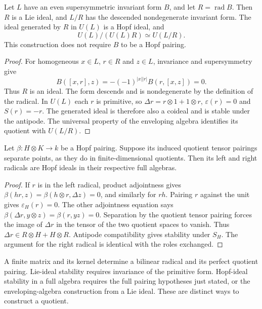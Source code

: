 \begin{proposition}
\label{lem:hopf-radical-ideal-coideal}
Let $L$ have an even supersymmetric invariant form $B$, and let
$R=\operatorname{rad}B$. Then $R$ is a Lie ideal, and $L/R$
has the descended nondegenerate invariant form. The ideal
generated by $R$ in $U(L)$ is a Hopf ideal, and
\[
 U(L)/(U(L)R)\simeq U(L/R).
\]
This construction does not require $B$ to be a Hopf pairing.
\end{proposition}

\begin{proof}
For homogeneous $x\in L$, $r\in R$ and $z\in L$, invariance
and supersymmetry give
\[
 B([x,r],z)=-(-1)^{|x||r|}B(r,[x,z])=0.
\]
Thus $R$ is an ideal. The form descends and is nondegenerate
by the definition of the radical. In $U(L)$ each $r$ is
primitive, so $\Delta r=r\otimes1+1\otimes r$,
$\varepsilon(r)=0$ and $S(r)=-r$. The generated ideal is
therefore also a coideal and is stable under the antipode.
The universal property of the enveloping algebra identifies
its quotient with $U(L/R)$.
\end{proof}

\begin{proposition}
\label{hall:prop:full-hopf-radical}
Let $\beta:H\otimes K\to k$ be a Hopf pairing. Suppose its
induced quotient tensor pairings separate points, as they do
in finite-dimensional quotients. Then its left and right
radicals are Hopf ideals in their respective full algebras.
\end{proposition}

\begin{proof}
If $r$ is in the left radical, product adjointness gives
$\beta(hr,z)=\beta(h\otimes r,\Delta z)=0$, and similarly
for $rh$. Pairing $r$ against the unit gives
$\varepsilon_H(r)=0$. The other adjointness equation says
$\beta(\Delta r,y\otimes z)=\beta(r,yz)=0$.
Separation by the quotient tensor pairing forces the image
of $\Delta r$ in the tensor of the two quotient spaces to
vanish. Thus $\Delta r\in R\otimes H+H\otimes R$.
Antipode compatibility gives stability under $S_H$.
The argument for the right radical is identical with the
roles exchanged.
\end{proof}

\begin{proposition}
\label{prop:pairing-matrix-not-hopf-pairing-proof}
\label{prop:geometric-hopf-pairing-data-give-defects}
A finite matrix and its kernel determine a bilinear radical
and its perfect quotient pairing. Lie-ideal stability requires
invariance of the primitive form. Hopf-ideal stability in a
full algebra requires the full pairing hypotheses just stated,
or the enveloping-algebra construction from a Lie ideal.
These are distinct ways to construct a quotient.
\end{proposition}

